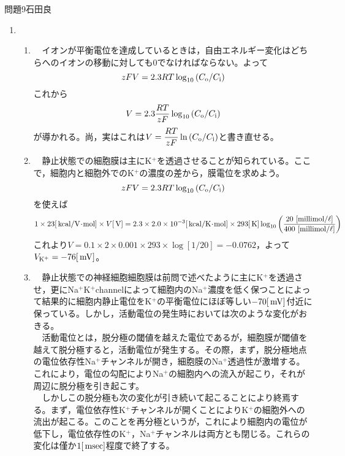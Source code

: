 \documentclass[fleqn]{jbook}
\def\ds{\displaystyle}
\def\o{{\rm o}}
\def\i{{\rm i}}
\def\millimol{{\rm ~[millimol/\ell]}}
\begin{document}
\begin{answer}{問題9}{石田良}
\setcounter{equation}{0}



\begin{enumerate}

  \item 　
  
    \begin{enumerate}
    
    \item 　イオンが平衡電位を達成しているときは，自由エネルギー変化はどちらへのイオンの移動に対しても$0$でなければならない。よって
$$
zFV=2.3RT\log_{10}\left(C_\o/C_\i\right)
$$
これから
$$
V=2.3\frac{RT}{zF}\log_{10}\left(C_\o/C_\i\right)
$$
が導かれる。尚，実はこれは$\ds V=\frac{RT}{zF}\ln\left(C_\o/C_\i\right)$と書き直せる。\\
    
    \item 　静止状態での細胞膜は主にK$^{+}$を透過させることが知られている。ここで，細胞内と細胞外でのK$^{+}$の濃度の差から，膜電位を求めよう。
$$
zFV=2.3RT\log_{10}\left(C_\o/C_\i\right)
$$
を使えば
$$
1\times23[\Unit{kcal/V\!\cdot\! mol}]\times V[\Unit{V}]=2.3\times 2.0\times 10^{-3}[\Unit{kcal/K\!\cdot\! mol}]\times 293[\Unit{K}]\log_{10}\left(\frac{20\millimol}{400\millimol}\right)
$$
これより$V = 0.1\times 2\times 0.001\times 293\times \log\left[1/20\right]=-0.0762$，よって$V_{\rm K^+}=-76[\,{\rm mV}]$。\\
    
    \item 　静止状態での神経細胞細胞膜は前問で述べたように主にK$^{+}$を透過させ，更にNa$^{+}$K$^{+}$channelによって細胞内のNa$^{+}$濃度を低く保つことによって結果的に細胞内静止電位をK$^{+}$の平衡電位にほぼ等しい$-70[\,{\rm mV}]$付近に保っている。しかし，活動電位の発生時においては次のような変化がおきる。\\
　活動電位とは，脱分極の閾値を越えた電位であるが，細胞膜が閾値を越えて脱分極すると，活動電位が発生する。その際，まず，脱分極地点の電位依存性Na$^{+}$チャンネルが開き，細胞膜のNa$^{+}$透過性が激増する。これにより，電位の勾配によりNa$^{+}$の細胞内への流入が起こり，それが周辺に脱分極を引き起こす。\\
　しかしこの脱分極も次の変化が引き続いて起こることにより終焉する。まず，電位依存性K$^{+}$チャンネルが開くことによりK$^{+}$の細胞外への流出が起こる。このことを再分極というが，これにより細胞内の電位が低下し，電位依存性のK$^{+}$，Na$^{+}$チャンネルは両方とも閉じる。これらの変化は僅か$1[\,{\rm msec}]$程度で終了する。\\
    

\end{enumerate}
\end{enumerate}
\end{answer}
\end{document}
